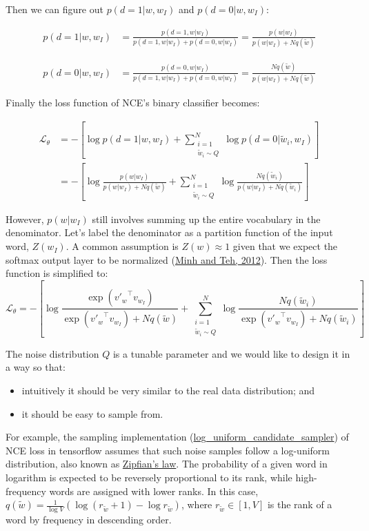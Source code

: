 Then we can figure out $p(d=1 \vert w, w_I)$ and $p(d=0 \vert w, w_I)$:

\begin{align*}
p(d=1 \vert w, w_I) 
&= \frac{p(d=1, w \vert w_I)}{p(d=1, w \vert w_I) + p(d=0, w \vert w_I)}
= \frac{p(w \vert w_I)}{p(w \vert w_I) + Nq(\tilde{w})}
\end{align*}

\begin{align*}
p(d=0 \vert w, w_I) 
&= \frac{p(d=0, w \vert w_I)}{p(d=1, w \vert w_I) + p(d=0, w \vert w_I)}
= \frac{Nq(\tilde{w})}{p(w \vert w_I) + Nq(\tilde{w})}
\end{align*}


Finally the loss function of NCE's binary classifier becomes:

\begin{align*}
\mathcal{L}_\theta 
& = - [ \log p(d=1 \vert w, w_I) +  \sum_{\substack{i=1 \\ \tilde{w}_i \sim Q}}^N \log p(d=0|\tilde{w}_i, w_I)] \\
& = - [ \log \frac{p(w \vert w_I)}{p(w \vert w_I) + Nq(\tilde{w})} +  \sum_{\substack{i=1 \\ \tilde{w}_i \sim Q}}^N \log \frac{Nq(\tilde{w}_i)}{p(w \vert w_I) + Nq(\tilde{w}_i)}]
\end{align*}

However, $p(w \vert w_I)$ still involves summing up the entire vocabulary in the denominator. Let’s label the denominator as a partition function of the input word, $Z(w_I)$. A common assumption is $Z(w) \approx 1$ given that we expect the softmax output layer to be normalized (\href{https://www.cs.toronto.edu/~amnih/papers/ncelm.pdf}{Minh and Teh, 2012}). Then the loss function is simplified to:
\[
\mathcal{L}_\theta = - [ \log \frac{\exp({v'_w}^{\top}{v_{w_I}})}{\exp({v'_w}^{\top}{v_{w_I}}) + Nq(\tilde{w})} +  \sum_{\substack{i=1 \\ \tilde{w}_i \sim Q}}^N \log \frac{Nq(\tilde{w}_i)}{\exp({v'_w}^{\top}{v_{w_I}}) + Nq(\tilde{w}_i)}]
\]

The noise distribution $Q$ is a tunable parameter and we would like to design it in a way so that:
\begin{itemize}
    \item intuitively it should be very similar to the real data distribution; and
    \item it should be easy to sample from.
\end{itemize}

For example, the sampling implementation (\href{https://github.com/tensorflow/tensorflow/blob/master/tensorflow/python/ops/candidate_sampling_ops.py#L83}{log\_uniform\_candidate\_sampler}) of NCE loss in tensorflow assumes that such noise samples follow a log-uniform distribution, also known as \href{https://en.wikipedia.org/wiki/Zipf%27s_law}{Zipfian’s law}. The probability of a given word in logarithm is expected to be reversely proportional to its rank, while high-frequency words are assigned with lower ranks. In this case, $q(\tilde{w}) = \frac{1}{ \log V}(\log (r_{\tilde{w}} + 1) - \log r_{\tilde{w}})$, where $r_{\tilde{w}} \in [1, V]$ is the rank of a word by frequency in descending order.

